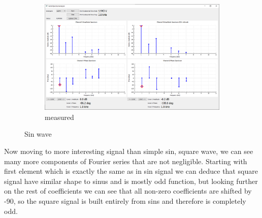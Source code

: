 \documentclass[notitlepage, a4paper, 11pt]{article}
\begin{document}
\begin{figure}[H]
\begin{subfigure}[][][t]{0.28\textwidth}
			\includegraphics[width=\textwidth, trim=10 80 555 100, clip]{../img/Circuit1/sin}
			\caption{measured}
			\label{fig:meas-signal-a}
		\end{subfigure}
		\caption{Sin wave}
		\label{fig:pure-sin}
	\end{figure}
	
	Now moving to more interesting signal than simple sin, square wave, we can see many more components of Fourier series that are not negligible. Starting with first element which is exactly the same as in sin signal we can deduce that square signal have similar shape to sinus and is mostly odd function, but looking further on the rest of coefficients we can see that all non-zero coefficients are shifted by -90\degree, so the square signal is built entirely from sins and therefore is completely odd.
	
\end{document}
